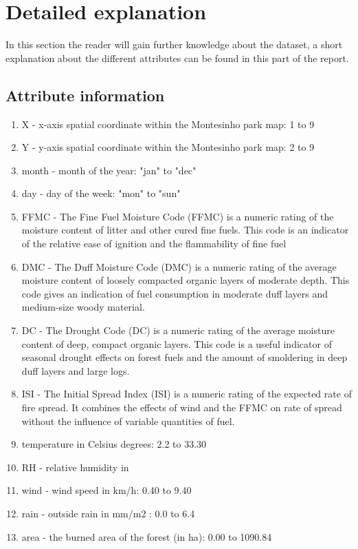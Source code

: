 \section{Detailed explanation}
In this section the reader will gain further knowledge about the dataset, a short explanation about the different attributes can be found in this part of the report.   

\subsection{Attribute information}
\begin{enumerate}
	\item X - x-axis spatial coordinate within the Montesinho park map: 1 to 9
	\item Y - y-axis spatial coordinate within the Montesinho park map: 2 to 9
	\item month - month of the year: "jan" to "dec" 
	\item day - day of the week: "mon" to "sun"
	\item FFMC - The Fine Fuel Moisture Code (FFMC) is a numeric rating of the moisture content of litter and other cured fine fuels. This code is an indicator of the relative ease of ignition and the flammability of fine fuel
	\item DMC - The Duff Moisture Code (DMC) is a numeric rating of the average moisture content of loosely compacted organic layers of moderate depth. This code gives an indication of fuel consumption in moderate duff layers and medium-size woody material.
	\item DC - The Drought Code (DC) is a numeric rating of the average moisture content of deep, compact organic layers. This code is a useful indicator of seasonal drought effects on forest fuels and the amount of smoldering in deep duff layers and large logs.
	\item ISI - The Initial Spread Index (ISI) is a numeric rating of the expected rate of fire spread. It combines the effects of wind and the FFMC on rate of spread without the influence of variable quantities of fuel.
	\item temperature in Celsius degrees: 2.2 to 33.30
	\item RH - relative humidity in %
	\item wind - wind speed in km/h: 0.40 to 9.40 
	\item rain - outside rain in mm/m2 : 0.0 to 6.4 
	\item area - the burned area of the forest (in ha): 0.00 to 1090.84 
\end{enumerate}

